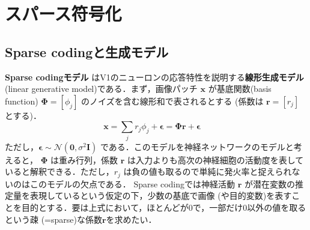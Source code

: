 \section{スパース符号化}\subsection{Sparse codingと生成モデル}\textbf{Sparse codingモデル} \cite{Olshausen1996-xe} \cite{Olshausen1997-qu}はV1のニューロンの応答特性を説明する\textbf{線形生成モデル} (linear generative model)である．まず，画像パッチ $\mathbf{x}$ が基底関数(basis function) $\mathbf{\Phi} = [\phi_j]$ のノイズを含む線形和で表されるとする (係数は $\mathbf{r}=[r_j]$ とする)．
$$
\mathbf{x} = \sum_j r_j \phi_j +\boldsymbol{\epsilon}= \mathbf{\Phi} \mathbf{r}+ \boldsymbol{\epsilon} \quad \tag{1}
$$
ただし，$\boldsymbol{\epsilon} \sim \mathcal{N}(\mathbf{0}, \sigma^2 \mathbf{I})$ である．このモデルを神経ネットワークのモデルと考えると， $\mathbf{\Phi}$ は重み行列，係数 $\mathbf{r}$ は入力よりも高次の神経細胞の活動度を表していると解釈できる．ただし，$r_j$ は負の値も取るので単純に発火率と捉えられないのはこのモデルの欠点である．
Sparse codingでは神経活動 $\mathbf{r}$ が潜在変数の推定量を表現しているという仮定の下，少数の基底で画像 (や目的変数)を表すことを目的とする．要は上式において，ほとんどが0で，一部だけ0以外の値を取るという疎 (=sparse)な係数$\mathbf{r}$を求めたい．